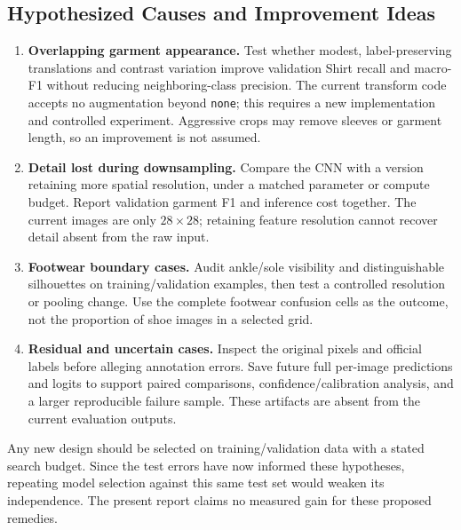 \subsection{Hypothesized Causes and Improvement Ideas}

\begin{enumerate}
    \item \textbf{Overlapping garment appearance.} Test whether modest, label-preserving translations and contrast variation improve validation Shirt recall and macro-F1 without reducing neighboring-class precision. The current transform code accepts no augmentation beyond \texttt{none}; this requires a new implementation and controlled experiment. Aggressive crops may remove sleeves or garment length, so an improvement is not assumed.
    \item \textbf{Detail lost during downsampling.} Compare the CNN with a version retaining more spatial resolution, under a matched parameter or compute budget. Report validation garment F1 and inference cost together. The current images are only $28\times28$; retaining feature resolution cannot recover detail absent from the raw input.
    \item \textbf{Footwear boundary cases.} Audit ankle/sole visibility and distinguishable silhouettes on training/validation examples, then test a controlled resolution or pooling change. Use the complete footwear confusion cells as the outcome, not the proportion of shoe images in a selected grid.
    \item \textbf{Residual and uncertain cases.} Inspect the original pixels and official labels before alleging annotation errors. Save future full per-image predictions and logits to support paired comparisons, confidence/calibration analysis, and a larger reproducible failure sample. These artifacts are absent from the current evaluation outputs.
\end{enumerate}

Any new design should be selected on training/validation data with a stated search budget. Since the test errors have now informed these hypotheses, repeating model selection against this same test set would weaken its independence. The present report claims no measured gain for these proposed remedies.
